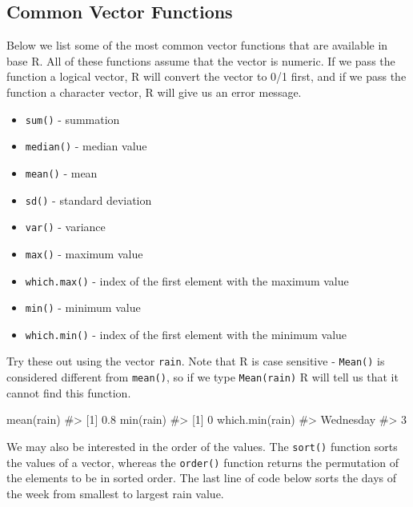 \documentclass[
  letterpaper,
]{krantz}
\makeatletter
\newenvironment{Shaded}{\begin{snugshade}}{\end{snugshade}}
\newcommand{\CommentTok}[1]{\textcolor[rgb]{0.37,0.37,0.37}{#1}}
\newcommand{\FunctionTok}[1]{\textcolor[rgb]{0.28,0.35,0.67}{#1}}
\newcommand{\NormalTok}[1]{\textcolor[rgb]{0.00,0.23,0.31}{#1}}
\providecommand{\tightlist}{%
  \setlength{\itemsep}{0pt}\setlength{\parskip}{0pt}}\usepackage{longtable,booktabs,array}
\newenvironment{kframe}{%
\medskip{}
\setlength{\fboxsep}{.8em}
 \def\at@end@of@kframe{}%
 \ifinner\ifhmode%
  \def\at@end@of@kframe{\end{minipage}}%
  \begin{minipage}{\columnwidth}%
 \fi\fi%
 \def\FrameCommand##1{\hskip\@totalleftmargin \hskip-\fboxsep
 \colorbox{shadecolor}{##1}\hskip-\fboxsep
     \hskip-\linewidth \hskip-\@totalleftmargin \hskip\columnwidth}%
 \MakeFramed {\advance\hsize-\width
   \@totalleftmargin\z@ \linewidth\hsize
   \@setminipage}}%
 {\par\unskip\endMakeFramed%
 \at@end@of@kframe}
\renewenvironment{Shaded}{\begin{kframe}}{\end{kframe}}
\makeatother
\begin{document}
\hypertarget{common-vector-functions}{%
\subsection{Common Vector Functions}\label{common-vector-functions}}

Below we list some of the most common vector functions that are
available in base R. All of these functions assume that the vector is
numeric. If we pass the function a logical vector, R will convert the
vector to 0/1 first, and if we pass the function a character vector, R
will give us an error message.

\begin{itemize}
\tightlist
\item
  \texttt{sum()} - summation
\item
  \texttt{median()} - median value
\item
  \texttt{mean()} - mean
\item
  \texttt{sd()} - standard deviation
\item
  \texttt{var()} - variance
\item
  \texttt{max()} - maximum value
\item
  \texttt{which.max()} - index of the first element with the maximum
  value
\item
  \texttt{min()} - minimum value
\item
  \texttt{which.min()} - index of the first element with the minimum
  value
\end{itemize}

Try these out using the vector \texttt{rain}. Note that R is case
sensitive - \texttt{Mean()} is considered different from
\texttt{mean()}, so if we type \texttt{Mean(rain)} R will tell us that
it cannot find this function.

\begin{Shaded}
\begin{Highlighting}[]
\FunctionTok{mean}\NormalTok{(rain)  }
\CommentTok{\#\textgreater{} [1] 0.8}
\FunctionTok{min}\NormalTok{(rain) }
\CommentTok{\#\textgreater{} [1] 0}
\FunctionTok{which.min}\NormalTok{(rain) }
\CommentTok{\#\textgreater{} Wednesday }
\CommentTok{\#\textgreater{}         3}
\end{Highlighting}
\end{Shaded}

We may also be interested in the order of the values. The
\texttt{sort()} function sorts the values of a vector, whereas the
\texttt{order()} function returns the permutation of the elements to be
in sorted order. The last line of code below sorts the days of the week
from smallest to largest rain value.
\end{document}
